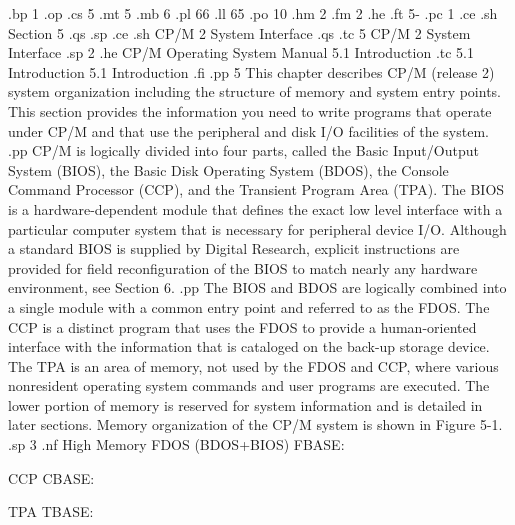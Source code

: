 .bp 1
.op
.cs 5
.mt 5
.mb 6
.pl 66
.ll 65
.po 10
.hm 2
.fm 2
.he
.ft                                5-%
.pc 1
.ce
.sh
Section 5
.qs
.sp
.ce
.sh
CP/M 2 System Interface
.qs
.tc 5  CP/M 2 System Interface
.sp 2
.he CP/M Operating System Manual                    5.1  Introduction
.tc    5.1  Introduction
5.1  Introduction
.fi
.pp 5
This chapter describes CP/M (release 2) system organization including the
structure of memory and system entry points.  This section provides
the information you need to write programs that operate under CP/M and
that use the peripheral and disk I/O facilities of the system.
.pp
CP/M is logically divided into four parts, called the Basic Input/Output 
System (BIOS), the Basic Disk Operating System (BDOS), the Console Command
Processor (CCP), and the Transient Program Area (TPA).  The BIOS is a
hardware-dependent module that defines the exact low level interface with a
particular computer system that is necessary for peripheral device I/O.
Although a standard BIOS is supplied by Digital Research, explicit
instructions are provided for field reconfiguration of the BIOS to match
nearly any hardware environment, see Section 6.
.pp
The BIOS and BDOS are
logically combined into a single module with a common entry point and
referred to as the FDOS.  The CCP is a distinct program that uses the FDOS to
provide a human-oriented interface with the information that is cataloged on
the back-up storage device.  The TPA is an area of memory, 
not used by the FDOS and CCP, where various nonresident operating
system commands and user programs are executed.  The lower portion of memory
is reserved for system information and is detailed in later sections.  Memory
organization of the CP/M system is shown in Figure 5-1.
.sp 3
.nf
                  High
                  Memory     FDOS (BDOS+BIOS)
                  FBASE:

                                   CCP
                  CBASE:

                                   TPA
                  TBASE:


